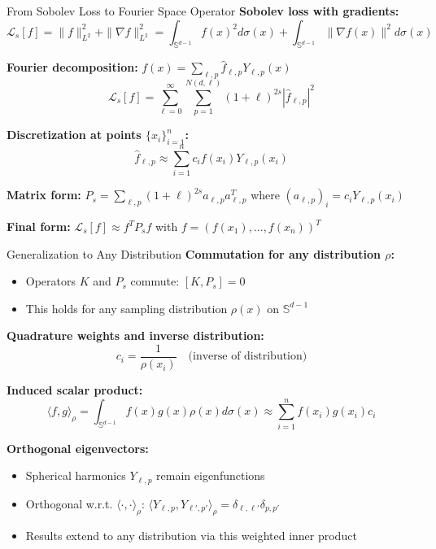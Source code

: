 \documentclass{beamer}
\newcommand{\Sd}{\mathbb{S}^{d-1}}
\begin{document}
\begin{frame}{From Sobolev Loss to Fourier Space Operator}
\textbf{Sobolev loss with gradients:}
\[ \mathcal{L}_s[f] = \|f\|_{L^2}^2 + \|\nabla f\|_{L^2}^2 = \int_{\Sd} f(x)^2 d\sigma(x) + \int_{\Sd} \|\nabla f(x)\|^2 d\sigma(x) \]

\textbf{Fourier decomposition:} $f(x) = \sum_{\ell,p} \hat{f}_{\ell,p} Y_{\ell,p}(x)$
\[ \mathcal{L}_s[f] = \sum_{\ell=0}^{\infty} \sum_{p=1}^{N(d,\ell)} (1+\ell)^{2s} |\hat{f}_{\ell,p}|^2 \]

\textbf{Discretization at points $\{x_i\}_{i=1}^n$:}
\[ \hat{f}_{\ell,p} \approx \sum_{i=1}^n c_i f(x_i) Y_{\ell,p}(x_i) \]

\textbf{Matrix form:} $P_s = \sum_{\ell,p} (1+\ell)^{2s} a_{\ell,p} a_{\ell,p}^T$
where $(a_{\ell,p})_i = c_i Y_{\ell,p}(x_i)$

\textbf{Final form:} $\mathcal{L}_s[f] \approx f^T P_s f$ with $f = (f(x_1), \ldots, f(x_n))^T$
\end{frame}

\begin{frame}{Generalization to Any Distribution}
\textbf{Commutation for any distribution $\rho$:}
\begin{itemize}
\item Operators $K$ and $P_s$ commute: $[K, P_s] = 0$
\item This holds for any sampling distribution $\rho(x)$ on $\Sd$
\end{itemize}

\textbf{Quadrature weights and inverse distribution:}
\[ c_i = \frac{1}{\rho(x_i)} \quad \text{(inverse of distribution)} \]

\textbf{Induced scalar product:}
\[ \langle f, g \rangle_\rho = \int_{\Sd} f(x) g(x) \rho(x) d\sigma(x) \approx \sum_{i=1}^n f(x_i) g(x_i) c_i \]

\textbf{Orthogonal eigenvectors:}
\begin{itemize}
\item Spherical harmonics $Y_{\ell,p}$ remain eigenfunctions
\item Orthogonal w.r.t. $\langle \cdot, \cdot \rangle_\rho$: $\langle Y_{\ell,p}, Y_{\ell',p'} \rangle_\rho = \delta_{\ell,\ell'} \delta_{p,p'}$
\item Results extend to any distribution via this weighted inner product
\end{itemize}
\end{frame}
\end{document}
